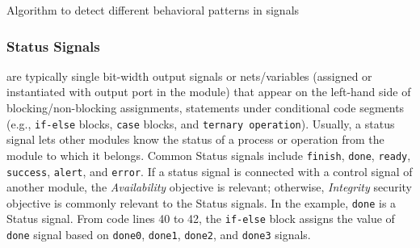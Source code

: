 \begin{algorithm}[t!]
\footnotesize

\caption{Algorithm to detect different behavioral patterns in signals}\label{alg:one}

\vspace{1mm}
 {

 {

}

}

\end{algorithm}



\subsubsection{Status Signals\label{sssec:status}} are typically single bit-width output signals or nets/variables (assigned or instantiated with output port in the module) that appear on the left-hand side of blocking/non-blocking assignments, statements under conditional code segments (e.g., \texttt{if-else} blocks, \texttt{case} blocks, and \texttt{ternary operation}). 
Usually, a status signal lets other modules know the status of a process or operation from the module to which it belongs. 
Common Status signals include \texttt{finish}, \texttt{done}, \texttt{ready}, \texttt{success}, \texttt{alert}, and \texttt{error}. 
If a status signal is connected with a control signal of another module, the \textit{Availability} objective is relevant; otherwise, \textit{Integrity} security objective is commonly relevant to the Status signals.
In the example, \texttt{done} is a Status signal. From code lines 40 to 42, the \texttt{if-else} block assigns the value of \texttt{done} signal based on \texttt{done0}, \texttt{done1}, \texttt{done2}, and \texttt{done3} signals. 

